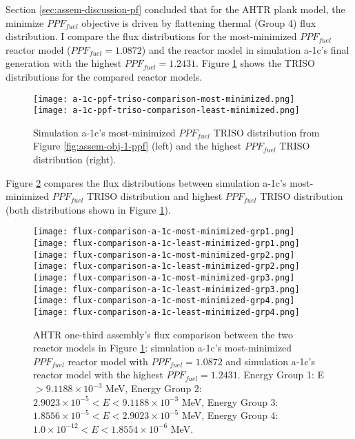 Section \ref{sec:assem-discussion-pf} concluded that for the \gls{AHTR} plank 
model, the minimize $PPF_{fuel}$ objective is driven by flattening thermal 
(Group 4) flux distribution. 
I compare the flux distributions for the most-minimized $PPF_{fuel}$ reactor model  
($PPF_{fuel} = 1.0872$) and the reactor model in simulation a-1c's final generation
with the highest $PPF_{fuel} = 1.2431$. 
Figure \ref{fig:a-1c-ppf-triso-comparison} shows the TRISO distributions for the 
compared reactor models. 
\begin{figure}[htbp!]
    \centering
    \texttt{[image: a-1c-ppf-triso-comparison-most-minimized.png]} 
    \texttt{[image: a-1c-ppf-triso-comparison-least-minimized.png]} 
    \caption{Simulation a-1c's most-minimized $PPF_{fuel}$ TRISO distribution 
    from Figure \ref{fig:assem-obj-1-ppf} (left) and the highest $PPF_{fuel}$ TRISO distribution (right).}
    \label{fig:a-1c-ppf-triso-comparison}
\end{figure}

Figure \ref{fig:a-1c-flux-comparison} compares the flux distributions between 
simulation a-1c's most-minimized $PPF_{fuel}$ TRISO distribution and highest 
$PPF_{fuel}$ TRISO distribution (both distributions shown in Figure 
\ref{fig:a-1c-ppf-triso-comparison}). 
\begin{figure}[htbp!]
    \centering
    \texttt{[image: flux-comparison-a-1c-most-minimized-grp1.png]} 
    \texttt{[image: flux-comparison-a-1c-least-minimized-grp1.png]} 
    \texttt{[image: flux-comparison-a-1c-most-minimized-grp2.png]} 
    \texttt{[image: flux-comparison-a-1c-least-minimized-grp2.png]} 
    \texttt{[image: flux-comparison-a-1c-most-minimized-grp3.png]} 
    \texttt{[image: flux-comparison-a-1c-least-minimized-grp3.png]} 
    \texttt{[image: flux-comparison-a-1c-most-minimized-grp4.png]} 
    \texttt{[image: flux-comparison-a-1c-least-minimized-grp4.png]} 
    \caption{AHTR one-third assembly's flux comparison between the two reactor models 
    in Figure \ref{fig:a-1c-ppf-triso-comparison}: simulation a-1c's most-minimized 
    $PPF_{fuel}$ reactor model with $PPF_{fuel} = 1.0872$ and simulation a-1c's reactor 
    model with the highest $PPF_{fuel} = 1.2431$.
    Energy Group 1: E $> 9.1188 \times 10^{-3}$ MeV, 
    Energy Group 2: $2.9023 \times 10^{-5} < E < 9.1188 \times 10^{-3}$ MeV,
    Energy Group 3:  $1.8556 \times 10^{-5} < E < 2.9023 \times 10^{-5}$ MeV,
    Energy Group 4:  $1.0 \times 10^{-12} < E < 1.8554 \times 10^{-6}$ MeV.}
    \label{fig:a-1c-flux-comparison}
\end{figure}

